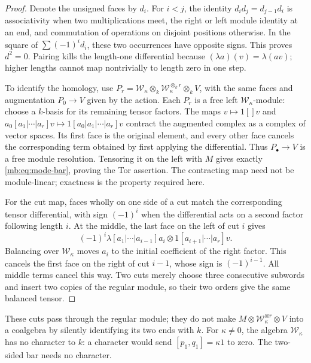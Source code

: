 \begin{proof}
Denote the unsigned faces by \(d_i\).
For \(i<j\), the identity \(d_id_j=d_{j-1}d_i\)
is associativity when two multiplications meet, the right or left
module identity at an end, and commutation of operations on disjoint
positions otherwise.  In the square of \(\sum(-1)^i d_i\),
these two occurrences have opposite signs.  This proves \(d^2=0\).
Pairing kills the length-one differential because
\((\lambda a)(v)=\lambda(av)\); higher lengths cannot map
nontrivially to length zero in one step.

To identify the homology, use
\(P_r=\mathscr W_\kappa\otimes_k
\mathscr W_\kappa^{\otimes_k r}\otimes_kV\), with the same
faces and augmentation \(P_0\to V\) given by the action.
Each \(P_r\) is a free left \(\mathscr W_\kappa\)-module:
choose a \(k\)-basis for its remaining tensor factors.
The maps \(v\mapsto1[]v\) and
\(a_0[a_1|\cdots|a_r]v\mapsto1[a_0|a_1|\cdots|a_r]v\)
contract the augmented complex as a complex of vector spaces.
Its first face is the original element, and every other face cancels
the corresponding term obtained by first applying the differential.
Thus \(P_\bullet\to V\) is a free module resolution.
Tensoring it on the left with \(M\) gives exactly
\eqref{mb:eq:mode-bar}, proving the Tor assertion.  The contracting map
need not be module-linear; exactness is the property required here.

For the cut map, faces wholly on one side of a cut match the
corresponding tensor differential, with sign \((-1)^i\) when
the differential acts on a second factor following length \(i\).
At the middle, the last face on the left of cut \(i\) gives
\[
 (-1)^i\lambda[a_1|\cdots|a_{i-1}]a_i
            \otimes 1[a_{i+1}|\cdots|a_r]v.
\]
Balancing over \(\mathscr W_\kappa\) moves \(a_i\) to
the initial coefficient of the right factor.  This cancels the first
face on the right of cut \(i-1\), whose sign is \((-1)^{i-1}\).
All middle terms cancel this way.  Two cuts merely choose three
consecutive subwords and insert two copies of the regular module,
so their two orders give the same balanced tensor.
\end{proof}

These cuts pass through the regular module; they do not make
\(M\otimes\mathscr W_\kappa^{\otimes r}\otimes V\)
into a coalgebra by silently identifying its two ends with \(k\).
For \(\kappa\ne0\), the algebra \(\mathscr W_\kappa\)
has no character to \(k\): a character would send
\([p_1,q_1]=\kappa1\) to zero.  The two-sided bar needs no character.

